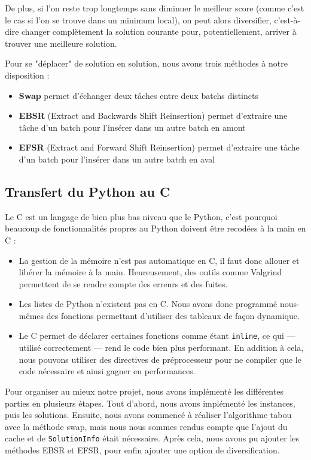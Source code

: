 \documentclass[hideweeklyreports]{polytech/polytech}
\newcommand{\codec}[1]{\texttt{#1}}
\begin{document}
				De plus, si l'on reste trop longtemps sans diminuer le meilleur score (comme c'est le cas si l'on se trouve dans un minimum local), on peut alors diversifier, c'est-à-dire changer complètement la solution courante pour, potentiellement, arriver à trouver une meilleure solution.
				
				\label{methR}
				Pour se "déplacer" de solution en solution, nous avons trois méthodes à notre disposition :
				\begin{itemize}
					\item \textbf{Swap} permet d'échanger deux tâches entre deux batchs distincts
					\item \textbf{EBSR} (Extract and Backwards Shift Reinsertion) permet d'extraire une tâche d'un batch pour l'insérer dans un autre batch en amont
					\item \textbf{EFSR} (Extract and Forward Shift Reinsertion) permet d'extraire une tâche d'un batch pour l'insérer dans un autre batch en aval
				\end{itemize}
			
			\subsection{Transfert du Python au C}
				Le C est un langage de bien plus bas niveau que le Python, c'est pourquoi beaucoup de fonctionnalités propres au Python doivent être recodées à la main en C :
				\begin{itemize}
					\item La gestion de la mémoire n'est pas automatique en C, il faut donc allouer et libérer la mémoire à la main. Heureusement, des outils comme Valgrind permettent de se rendre compte des erreurs et des fuites.
					\item Les listes de Python n'existent pas en C. Nous avons donc programmé nous-mêmes des fonctions permettant d'utiliser des tableaux de façon dynamique.
					\item Le C permet de déclarer certaines fonctions comme étant \codec{inline}, ce qui --- utilisé correctement --- rend le code bien plus performant. En addition à cela, nous pouvons utiliser des directives de préprocesseur pour ne compiler que le code nécessaire et ainsi gagner en performances.
				\end{itemize}
				
				Pour organiser au mieux notre projet, nous avons implémenté les différentes parties en plusieurs étapes. Tout d'abord, nous avons implémenté les instances, puis les solutions. Ensuite, nous avons commencé à réaliser l'algorithme tabou avec la méthode swap, mais nous nous sommes rendus compte que l'ajout du cache et de \codec{SolutionInfo} était nécessaire. Après cela, nous avons pu ajouter les méthodes EBSR et EFSR, pour enfin ajouter une option de diversification.
			
\end{document}
